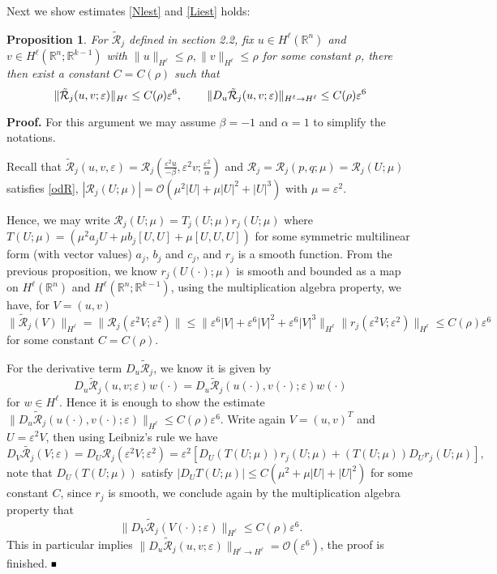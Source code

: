 \documentclass[letterpaper,11pt]{article}
\newcommand{\R}{\mathbb{R}}
\newcommand{\rmO}{\mathcal{O}}
\newcommand{\eps}{\varepsilon}
\newcommand{\Rm}{\mathcal{R}}
\numberwithin{equation}{section}
\theoremstyle{plain}
\newtheorem{proposition}[theorem]{Proposition}
\theoremstyle{remark}
\newenvironment{Proof}[1][.]%
 {\begin{trivlist}\item[]\textbf{Proof#1 }}%
 {\hspace*{\fill}$\rule{0.3\baselineskip}{0.35\baselineskip}$\end{trivlist}}
\begin{document}
Next we show estimates \eqref{Nlest} and \eqref{Liest} holds:
\begin{proposition}
For $\tilde{\Rm}_j$ defined in section 2.2, fix $u \in H^\ell(\R^n)$ and $v \in H^\ell(\R^n;\R^{k-1})$ with $\|u\|_{H^\ell}\le \rho, \|v\|_{H^\ell} \le \rho$ for some constant $\rho$, there then exist a constant $C=C(\rho)$ such that 
\[
\|\tilde{\Rm}_j(u,v;\eps)\|_{H^\ell} \le C(\rho) \eps^6, \hspace{0.3in}\|D_u \tilde{\Rm}_j(u,v;\eps)\|_{H^\ell \to H^\ell} \le C(\rho)\eps^6
\]
\end{proposition}
\begin{Proof}For this argument we may assume $\beta=-1$ and $\alpha=1$ to simplify the notations.

Recall that $\tilde{\Rm}_j(u,v,\eps) = \Rm_j(\frac{\eps^2 u}{-\beta}, \eps^2 v; \frac{\eps^2}{\alpha})$ and $\Rm_j = \Rm_j(p,q;\mu)=\Rm_j(U;\mu)$ satisfies \eqref{odR}, $|\Rm_j(U;\mu)| = \rmO(\mu^2|U|+\mu|U|^2+|U|^3)$ with $\mu =\eps^2$. 

Hence, we may write $\Rm_j(U;\mu) = T_j(U;\mu)r_j(U;\mu)$ where $T(U;\mu) = (\mu^2 a_jU+\mu b_j[U,U]+\mu [U,U,U])$ for some symmetric multilinear form (with vector values) $a_j$, $b_j$ and $c_j$, and $r_j$ is a smooth function. From the previous proposition, we know $r_j(U(\cdot);\mu)$ is smooth and bounded as a map on $H^\ell(\R^n)$ and $H^\ell(\R^n;\R^{k-1})$, using the multiplication algebra property, we have, for $V=(u,v)$
\[
\|\tilde{\Rm}_j(V)\|_{H^\ell} = \|\Rm_j(\eps^2V;\eps^2)\| \le \| \eps^6|V|+\eps^6|V|^2+\eps^6|V|^3 \|_{H^\ell} \|r_j(\eps^2V;\eps^2)\|_{H^\ell} \le C(\rho) \eps^6
\]
for some constant $C=C(\rho)$.

For the derivative term $D_u\tilde{\Rm}_j$, we know it is given by
\[
D_u\tilde{\Rm}_j(u,v;\eps) w (\cdot) = D_u \tilde{\Rm}_j(u(\cdot),v(\cdot);\eps) w(\cdot)
\]
for $w \in H^\ell$. Hence it is enough to show the estimate $\|D_u\tilde{\Rm}_j(u(\cdot),v(\cdot);\eps)\|_{H^\ell} \le C(\rho)\eps^6$. Write again $V=(u,v)^T$ and $U = \eps^2V$, then using Leibniz's rule we have
\[
D_V \tilde{\Rm_j}(V;\eps) = D_U \Rm_j(\eps^2V;\eps^2) = \eps^2\left[D_U(T(U;\mu))r_j(U;\mu)+ (T(U;\mu))D_U r_j(U;\mu)\right],
\]
note that $D_U(T(U;\mu))$ satisfy $|D_UT(U;\mu)| \le C(\mu^2+\mu|U|+|U|^2)$ for some constant $C$, since $r_j$ is smooth, we conclude again by the multiplication algebra property that
\[
\| D_V\tilde{\Rm}_j(V(\cdot);\eps)\|_{H^\ell} \le C(\rho)\eps^6.
\]
This in particular implies $\|D_u\tilde{\Rm}_j(u,v;\eps)\|_{H^\ell \to H^\ell} = \rmO(\eps^6)$, the proof is finished.
\end{Proof}
\end{document}

